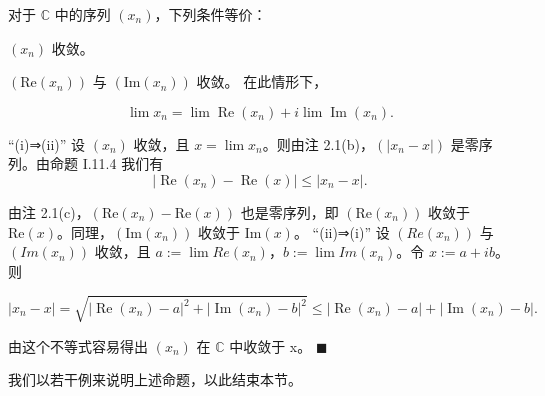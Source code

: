 \begin{proposition}

对于 $ \mathbb{C} $ 中的序列 $ (x_{n}) $，下列条件等价：

\begin{subitems}
\item

$ (x_{n}) $ 收敛。

\item

$ (\mathrm{Re}(x_n)) $ 与 $ (\mathrm{Im}(x_n)) $ 收敛。
在此情形下，

\[
\lim x_{n}=\lim\operatorname{R e}(x_{n})+i\lim\operatorname{I m}(x_{n}).
\]

\proofhead
“(i)⇒(ii)” 设 $ (x_n) $ 收敛，且 $ x = \lim x_n $。则由注 2.1(b)，$ (|x_n - x|) $ 是零序列。由命题 I.11.4 我们有
\[
\left|\operatorname{Re}(x_{n})-\operatorname{Re}(x)\right|\leq\left|x_{n}-x\right|.
\]

由注 2.1(c)，$ \left(\mathrm{Re}(x_{n}) - \mathrm{Re}(x)\right) $ 也是零序列，即 $ \left(\mathrm{Re}(x_{n})\right) $ 收敛于 $ \mathrm{Re}(x) $。同理，$ \left(\mathrm{Im}(x_{n})\right) $ 收敛于 $ \mathrm{Im}(x) $。
 “(ii)⇒(i)” 设 $ (Re(x_n)) $ 与 $ (Im(x_n)) $ 收敛，且 $ a := \lim Re(x_n) $，$ b := \lim Im(x_n) $。令 $ x := a + ib $。则

\[
|x_{n}-x|=\sqrt{|\operatorname{R e}(x_{n})-a|^{2}+|\operatorname{I m}(x_{n})-b|^{2}}\leq|\operatorname{R e}(x_{n})-a|+|\operatorname{I m}(x_{n})-b|.
\]

由这个不等式容易得出 $ (x_{n}) $ 在 $ \mathbb{C} $ 中收敛于 x。  $ \blacksquare $

\end{subitems}

\end{proposition}

我们以若干例来说明上述命题，以此结束本节。

